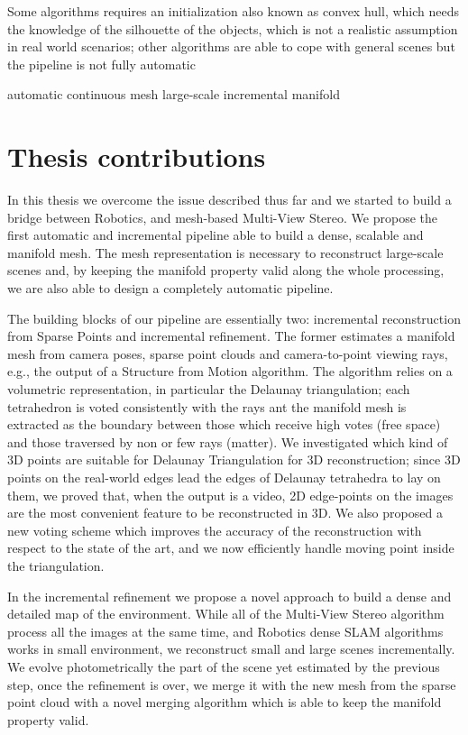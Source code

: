 Some algorithms requires an initialization also known as convex hull, which needs the knowledge of the silhouette of the objects, which  is not a realistic assumption in real world scenarios; other algorithms are able to cope with general scenes but the pipeline is not fully automatic






automatic
continuous mesh
large-scale
incremental
manifold





\section{Thesis contributions}
In this thesis we overcome the issue described thus far and we started to build a bridge between Robotics, and mesh-based Multi-View Stereo.
We propose the first automatic and incremental pipeline able to build a dense, scalable and manifold mesh.
The mesh representation is necessary to reconstruct  large-scale scenes and, by keeping the manifold property valid along the whole processing, we are also able to design a completely automatic pipeline.

The building blocks of our pipeline are essentially two: incremental reconstruction from Sparse Points and incremental refinement.
The former estimates a  manifold mesh from camera poses, sparse point clouds and camera-to-point viewing rays, e.g., the output of a Structure from Motion algorithm.
The algorithm relies on a volumetric representation, in particular the Delaunay triangulation; each tetrahedron is voted consistently with the rays ant the manifold mesh is extracted as the boundary between those which receive high votes (free space) and those traversed by non or few rays (matter).
We investigated which kind of 3D points are suitable for Delaunay Triangulation for 3D reconstruction; since 3D points on the real-world edges lead the edges of Delaunay tetrahedra to lay on them, we proved that, when the output is a video, 2D edge-points on the images are the most convenient feature to be reconstructed in 3D.
We also proposed a new voting scheme which improves the accuracy of the reconstruction with respect to the state of the art, and we now efficiently handle moving point inside the triangulation.

In the incremental refinement we propose a novel approach to build a dense and detailed map of the environment.
While all of the Multi-View Stereo algorithm process all the images  at the same time, and Robotics dense SLAM algorithms works in small environment, we reconstruct small and large scenes incrementally. 
We evolve photometrically the part of the scene yet estimated by the previous step, once the refinement is over, we merge it with the new mesh from the sparse point cloud with a novel merging algorithm which is able to keep the manifold property valid.

